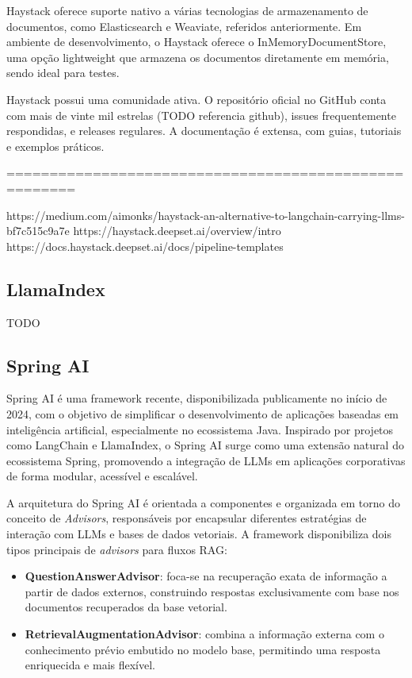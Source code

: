 Haystack oferece suporte nativo a várias tecnologias de armazenamento de documentos, como Elasticsearch e Weaviate, referidos anteriormente. Em ambiente de desenvolvimento, o Haystack oferece o InMemoryDocumentStore, uma opção lightweight que armazena os documentos diretamente em memória, sendo ideal para testes.


Haystack possui uma comunidade ativa. O repositório oficial no GitHub conta com mais de vinte mil estrelas (TODO referencia github), issues frequentemente respondidas, e releases regulares. A documentação é extensa, com guias, tutoriais e exemplos práticos.


======================================================

https://medium.com/aimonks/haystack-an-alternative-to-langchain-carrying-llms-bf7c515c9a7e
https://haystack.deepset.ai/overview/intro
https://docs.haystack.deepset.ai/docs/pipeline-templates



\subsection{LlamaIndex}

TODO



\subsection{Spring AI}


Spring AI é uma framework recente, disponibilizada publicamente no início de 2024, com o objetivo de simplificar o desenvolvimento de aplicações baseadas em inteligência artificial, especialmente no ecossistema Java. Inspirado por projetos como LangChain e LlamaIndex, o Spring AI surge como uma extensão natural do ecossistema Spring, promovendo a integração de LLMs em aplicações corporativas de forma modular, acessível e escalável.


A arquitetura do Spring AI é orientada a componentes e organizada em torno do conceito de \emph{Advisors}, responsáveis por encapsular diferentes estratégias de interação com LLMs e bases de dados vetoriais. A framework disponibiliza dois tipos principais de \textit{advisors} para fluxos RAG:

\begin{itemize} 
        \item \textbf{QuestionAnswerAdvisor}: foca-se na recuperação exata de informação a partir de dados externos, construindo respostas exclusivamente com base nos documentos recuperados da base vetorial. 
        \item \textbf{RetrievalAugmentationAdvisor}: combina a informação externa com o conhecimento prévio embutido no modelo base, permitindo uma resposta enriquecida e mais flexível. 
\end{itemize}

